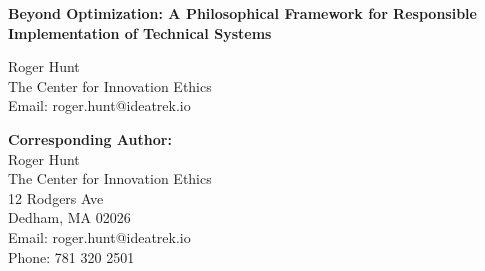 \documentclass[12pt,a4paper]{article}
\begin{document}
\begin{center}
{\LARGE \textbf{Beyond Optimization: A Philosophical Framework for Responsible Implementation of Technical Systems}}

\vspace{2cm}

{\large
Roger Hunt\\
\vspace{0.5cm}
The Center for Innovation Ethics\\
Email: roger.hunt@ideatrek.io\\
}

\vspace{1cm}

{\normalsize
\textbf{Corresponding Author:}\\
Roger Hunt\\
The Center for Innovation Ethics\\
12 Rodgers Ave\\
Dedham, MA 02026\\
Email: roger.hunt@ideatrek.io\\
Phone: 781 320 2501
}

\end{center}
\end{document}
